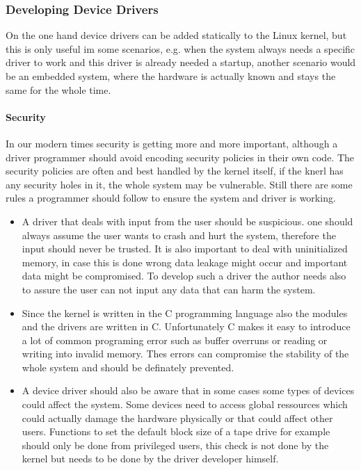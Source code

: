 \documentclass{sig-alternate-05-2015}
\begin{document}
\subsubsection{Developing Device Drivers}
On the one hand device drivers can be added statically to the Linux kernel, but this is only useful im some scenarios, e.g. when the system always needs a specific driver to work and this driver is already needed a startup, another scenario would be an embedded system, where the hardware is actually known and stays the same for the whole time. \cite{Corbet:2005:LDD:1209083} \\

\paragraph{Security}
In our modern times security is getting more and more important, although a driver programmer should avoid encoding security policies in their own code. The security policies are often and best handled by the kernel itself, if the knerl has any security holes in it, the whole system may be vulnerable. Still there are some rules a programmer should follow to ensure the system and driver is working.
\begin{itemize}
\item A driver that deals with input from the user should be suspicious. one should always assume the user wants to crash and hurt the system, therefore the input should never be trusted. It is also important to deal with uninitialized memory, in case this is done wrong data leakage might occur and important data might be compromised. To develop such a driver the author needs also to assure the user can not input any data that can harm the system.
\item Since the kernel is written in the C programming language also the modules and the drivers are written in C. Unfortunately C makes it easy to introduce a lot of common programing error such as buffer overruns or reading or writing into invalid memory. Thes errors can compromise the stability of the whole system and should be definately prevented.
\item A device driver should also be aware that in some cases some types of devices could affect the system. Some devices need to access global ressources which could actually damage the hardware physically or that could affect other users. Functions to set the default block size of a tape drive for example should only be done from privileged users, this check is not done by the kernel but needs to be done by the driver developer himself.
\end{itemize}
\end{document}
